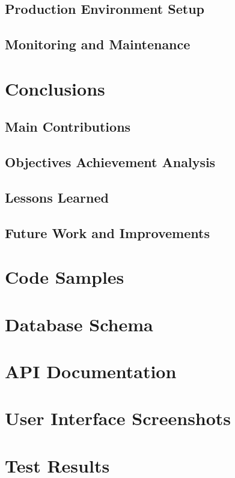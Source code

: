 \documentclass[12pt,a4paper]{report}
\begin{document}
\section{Production Environment Setup}

\section{Monitoring and Maintenance}

\chapter*{Conclusions}

\section*{Main Contributions}

\section*{Objectives Achievement Analysis}

\section*{Lessons Learned}

\section*{Future Work and Improvements}




\appendix
\chapter{Code Samples}

\chapter{Database Schema}

\chapter{API Documentation}

\chapter{User Interface Screenshots}

\chapter{Test Results}
\end{document}

